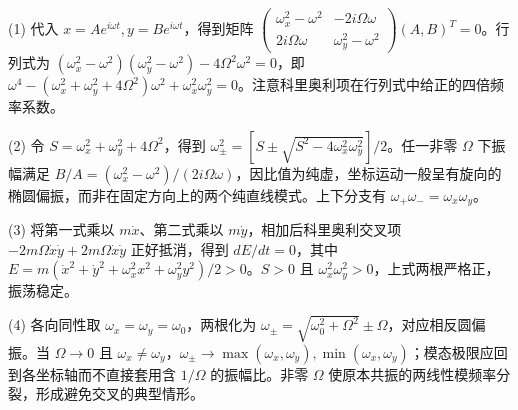 (1) 代入 \(x=Ae^{i\omega t},y=Be^{i\omega t}\)，得到矩阵 \(\begin{pmatrix}\omega_x^2-\omega^2&-2i\Omega\omega\\2i\Omega\omega&\omega_y^2-\omega^2\end{pmatrix}(A,B)^T=0\)。行列式为 \((\omega_x^2-\omega^2)(\omega_y^2-\omega^2)-4\Omega^2\omega^2=0\)，即 \(\omega^4-(\omega_x^2+\omega_y^2+4\Omega^2)\omega^2+\omega_x^2\omega_y^2=0\)。注意科里奥利项在行列式中给正的四倍频率系数。

(2) 令 \(S=\omega_x^2+\omega_y^2+4\Omega^2\)，得到 \(\omega_\pm^2=[S\pm\sqrt{S^2-4\omega_x^2\omega_y^2}]/2\)。任一非零 \(\Omega\) 下振幅满足 \(B/A=(\omega_x^2-\omega^2)/(2i\Omega\omega)\)，因比值为纯虚，坐标运动一般呈有旋向的椭圆偏振，而非在固定方向上的两个纯直线模式。上下分支有 \(\omega_+\omega_-=\omega_x\omega_y\)。

(3) 将第一式乘以 \(m\dot x\)、第二式乘以 \(m\dot y\)，相加后科里奥利交叉项 \(-2m\Omega\dot x\dot y+2m\Omega\dot x\dot y\) 正好抵消，得到 \(dE/dt=0\)，其中 \(E=m(\dot x^2+\dot y^2+\omega_x^2x^2+\omega_y^2y^2)/2>0\)。\(S>0\) 且 \(\omega_x^2\omega_y^2>0\)，上式两根严格正，振荡稳定。

(4) 各向同性取 \(\omega_x=\omega_y=\omega_0\)，两根化为 \(\omega_\pm=\sqrt{\omega_0^2+\Omega^2}\pm\Omega\)，对应相反圆偏振。当 \(\Omega\to0\) 且 \(\omega_x\ne\omega_y\)，\(\omega_\pm\to\max(\omega_x,\omega_y),\min(\omega_x,\omega_y)\)；模态极限应回到各坐标轴而不直接套用含 \(1/\Omega\) 的振幅比。非零 \(\Omega\) 使原本共振的两线性模频率分裂，形成避免交叉的典型情形。
